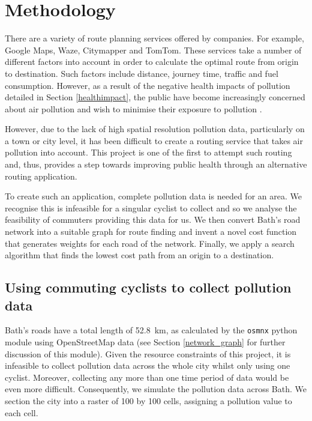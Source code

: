 \documentclass[11pt]{report}
\begin{document}
\section{Methodology} \label{meth:q3}

There are a variety of route planning services offered by companies. For example, Google Maps, Waze, Citymapper and TomTom. These services take a number of different factors into account in order to calculate the optimal route from origin to destination. Such factors include distance, journey time, traffic and fuel consumption. However, as a result of the negative health impacts of pollution detailed in Section \ref{healthimpact}, the public have become increasingly concerned about air pollution and wish to minimise their exposure to pollution \citep{hartog2010health}.

However, due to the lack of high spatial resolution pollution data, particularly on a town or city level, it has been difficult to create a routing service that takes air pollution into account. This project is one of the first to attempt such routing \citep{sharker2014exposureroutes, Hasenfratz2015highresmapsTram} and, thus, provides a step towards improving public health through an alternative routing application.

To create such an application, complete pollution data is needed for an area. We recognise this is infeasible for a singular cyclist to collect and so we analyse the feasibility of commuters providing this data for us. We then convert Bath's road network into a suitable graph for route finding and invent a novel cost function that generates weights for each road of the network. Finally, we apply a search algorithm that finds the lowest cost path from an origin to a destination. 

\subsection{Using commuting cyclists to collect pollution data}
% 

Bath's roads have a total length of 52.8~km, as calculated by the \texttt{osmnx} python module using OpenStreetMap data (see Section \ref{network_graph} for further discussion of this module). Given the resource constraints of this project, it is infeasible to collect pollution data across the whole city whilst only using one cyclist. Moreover, collecting any more than one time period of data would be even more difficult. Consequently, we simulate the pollution data across Bath. We section the city into a raster of 100 by 100 cells, assigning a pollution value to each cell.
\end{document}
